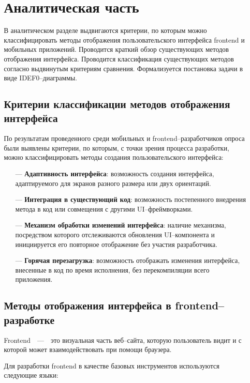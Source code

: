 \section{Аналитическая часть}

В аналитическом разделе выдвигаются критерии, по которым можно классифицировать методы отображения пользовательского интерфейса frontend и мобильных приложений.
Проводится краткий обзор существующих методов отображения интерфейса. 
Проводится классификация существующих методов согласно выдвинутым критериям сравнения. 
Формализуется постановка задачи в виде IDEF0--диаграммы.

\subsection{Критерии классификации методов отображения интерфейса} 
По результатам проведенного среди мобильных и frontend--разработчиков опроса были выявлены критерии, по которым, с точки зрения процесса разработки, можно классифицировать методы создания пользовательского интерфейса:

\begin{itemize}
	\item[---] \textbf{Адаптивность интерфейса}: возможность создания интерфейса, адаптируемого для экранов разного размера или двух ориентаций.
	\item[---] \textbf{Интеграция в существующий код}: возможность постепенного внедрения метода в код или совмещения с другими UI--фреймворками.
	\item[---] \textbf{Механизм обработки изменений интерфейса}: наличие механизма, посредством которого отслеживаются обновления UI--компонента и инициируется его повторное отображение без участия разработчика.
	\item[---] \textbf{Горячая перезагрузка}: возможность отображать изменения интерфейса, внесенные в код по время исполнения, без перекомпиляции всего приложения. 
\end{itemize}

\subsection{Методы отображения интерфейса в frontend--разработке} 

Frontend~~---~~это визуальная часть веб--сайта, которую пользователь видит и с которой может взаимодействовать при помощи браузера.

Для разработки frontend в качестве базовых инструментов используются следующие языки: 

